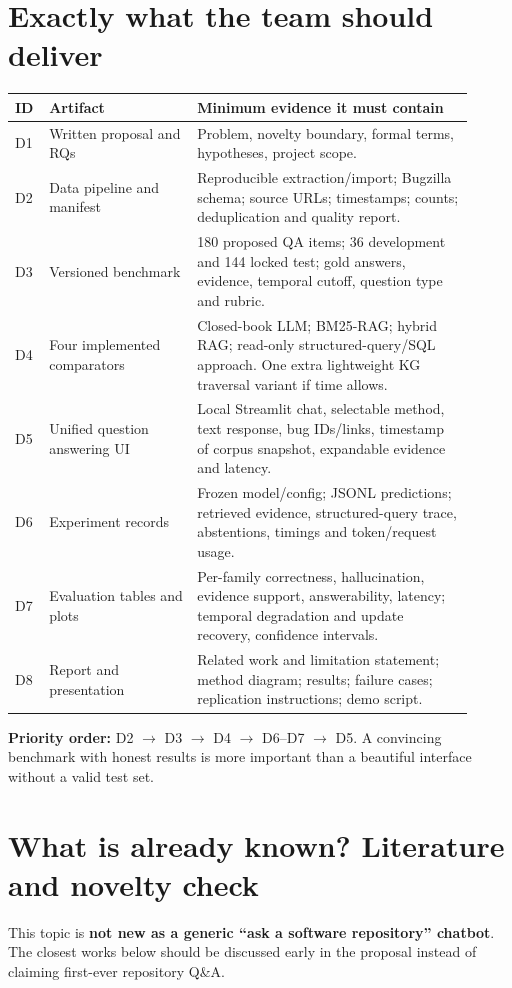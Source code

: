 \documentclass[11pt,a4paper]{article}
\begin{document}
\section{Exactly what the team should deliver}
\begin{longtable}{@{}p{0.05\linewidth}p{0.30\linewidth}p{0.56\linewidth}@{}}
\toprule
\textbf{ID}&\textbf{Artifact}&\textbf{Minimum evidence it must contain}\\ \midrule\endhead
D1&Written proposal and RQs&Problem, novelty boundary, formal terms, hypotheses, project scope.\\
D2&Data pipeline and manifest&Reproducible extraction/import; Bugzilla schema; source URLs; timestamps; counts; deduplication and quality report.\\
D3&Versioned benchmark&180 proposed QA items; 36 development and 144 locked test; gold answers, evidence, temporal cutoff, question type and rubric.\\
D4&Four implemented comparators&Closed-book LLM; BM25-RAG; hybrid RAG; read-only structured-query/SQL approach. One extra lightweight KG traversal variant if time allows.\\
D5&Unified question answering UI&Local Streamlit chat, selectable method, text response, bug IDs/links, timestamp of corpus snapshot, expandable evidence and latency.\\
D6&Experiment records&Frozen model/config; JSONL predictions; retrieved evidence, structured-query trace, abstentions, timings and token/request usage.\\
D7&Evaluation tables and plots&Per-family correctness, hallucination, evidence support, answerability, latency; temporal degradation and update recovery, confidence intervals.\\
D8&Report and presentation&Related work and limitation statement; method diagram; results; failure cases; replication instructions; demo script.\\ \bottomrule
\end{longtable}
\begin{warnbox}
\textbf{Priority order:} D2 $\rightarrow$ D3 $\rightarrow$ D4 $\rightarrow$ D6--D7 $\rightarrow$ D5. A convincing benchmark with honest results is more important than a beautiful interface without a valid test set.
\end{warnbox}

\section{What is already known? Literature and novelty check}
This topic is \textbf{not new as a generic ``ask a software repository'' chatbot}. The closest works below should be discussed early in the proposal instead of claiming first-ever repository Q\&A.
\end{document}
